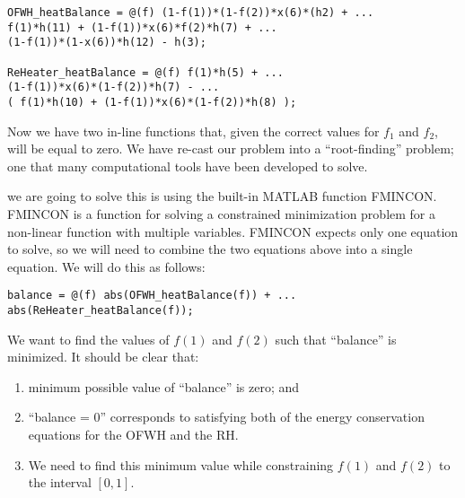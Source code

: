 \begin{minipage}{\linewidth} 
\begin{lstlisting}[caption=Energy balance equations in MATLAB format]
% f = [f1,f2]
OFWH_heatBalance = @(f) (1-f(1))*(1-f(2))*x(6)*(h2) + ...
f(1)*h(11) + (1-f(1))*x(6)*f(2)*h(7) + ...
(1-f(1))*(1-x(6))*h(12) - h(3);

ReHeater_heatBalance = @(f) f(1)*h(5) + ...
(1-f(1))*x(6)*(1-f(2))*h(7) - ...
( f(1)*h(10) + (1-f(1))*x(6)*(1-f(2))*h(8) );
\end{lstlisting}
\end{minipage}
Now we have two in-line functions that, given the correct values for $f_1$ and $f_2$, will be equal to zero.  We have re-cast our problem into a ``root-finding'' problem; one that many computational tools have been developed to solve.

 we are going to solve this is using the built-in MATLAB function FMINCON.  FMINCON is a function for solving a constrained minimization problem for a non-linear function with multiple variables.  FMINCON expects only one equation to solve, so we will need to combine the two equations above into a single equation.  We will do this as follows:

\begin{lstlisting}[caption=Combine two heat balace equations into one.]
balance = @(f) abs(OFWH_heatBalance(f)) + ...
abs(ReHeater_heatBalance(f));
\end{lstlisting}
We want to find the values of $f(1)$ and $f(2)$ such that ``balance'' is minimized.  It should be clear that:
\begin{enumerate}
\item minimum possible value of ``balance'' is zero; and
\item ``balance = 0'' corresponds to satisfying both of the energy conservation equations for the OFWH and the RH.
\item We need to find this minimum value while constraining $f(1)$ and $f(2)$ to the interval $[0,1]$.
\end{enumerate}


